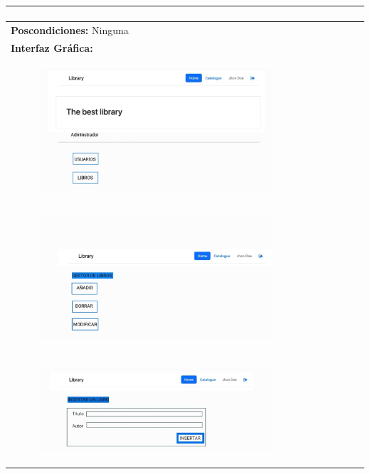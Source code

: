 \documentclass{report}
\begin{document}
\begin{longtable}{|p{\linewidth}|}
\begin{enumerate}
                \end{enumerate}\\
                \hline
                \textbf{Poscondiciones:} Ninguna\\
                \hline
                \textbf{Interfaz Gráfica:}\\
                \begin{figure}[H]
                    \centering
                    \includegraphics[width=0.8\textwidth]{./img/grafico/MenuAdmin.jpg}
                \end{figure}\\
                \hline
                \begin{figure}[H]
                        \centering
                        \includegraphics[width=0.8\textwidth]{./img/grafico/MenuGestorLibros.jpg}
                    \end{figure}\\
                    \hline
                    \begin{figure}[H]
                        \centering
                        \includegraphics[width=0.8\textwidth]{./img/grafico/InsertarLibro.jpg}

\end{figure}
\end{longtable}
\end{document}
